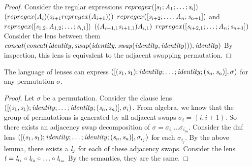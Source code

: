 \begin{lemma}
\begin{proof}
Consider the regular expressions $repregex([\mathit{s}_1;\mathit{A}_1; \ldots;\mathit{s}_i])$ $(repregex(\mathit{A}_i) (\mathit{s}_{i+1} repregex(\mathit{A}_{i+1})))$ $repregex([\mathit{s}_{i+2} ; \ldots ; \mathit{A}_{n} ; \mathit{s}_{n+1}])$ and 
$repregex([\mathit{s}_{1,2};\mathit{A}_{1,2}; \ldots;\mathit{s}_{i,1}])$ $((\mathit{A}_{i+1,1} \mathit{s}_{i+1,1})\mathit{A}_{i,1})$ $repregex([\mathit{s}_{i+2,1} ; \ldots ; \mathit{A}_{n} ; \mathit{s}_{n+1}])$
Consider the lens between them\\ $\mathit{concat}(\mathit{concat}(\mathit{identity},\mathit{swap}(\mathit{identity},\mathit{swap}(\mathit{identity},\mathit{identity}))),\mathit{identity})$
By inspection, this lens is equivalent to the adjacent swapping permutation.
\end{proof}
\end{lemma}

\begin{lemma}
\label{lem:perm-exp}
The language of lenses can express $([(\mathit{s}_1,\mathit{s}_1) ; \mathit{identity} ; \ldots ; \mathit{identity} ; (\mathit{s}_n,\mathit{s}_n)], \sigma)$
for any permutation $\sigma$.
\begin{proof}
Let $\sigma$ be a permutation.
Consider the clause lens $([(\mathit{s}_1,\mathit{s}_1) ; \mathit{identity} ; \ldots ; \mathit{identity} ; (\mathit{s}_n,\mathit{s}_n)], \sigma_{i})$.
From algebra, we know that the group of permutations is generated by all
adjacent swaps $\sigma_i = (i,i+1)$.
So there exists an adjacency swap decomposition of $\sigma = \sigma_{i_1}\ldots\sigma_{i_m}$.
Consider the dnf lens $([(\mathit{s}_1,\mathit{s}_1) ; \mathit{identity} ; \ldots ; \mathit{identity} ; (\mathit{s}_n,\mathit{s}_n)], \sigma_{i_j})$ for each $\sigma_{i_j}$.
By the above lemma, there exists a $\mathit{l}_j$ for each of these adjacency swaps.
Consider the lens $\mathit{l} = \mathit{l}_{i_1} \circ \mathit{l}_{i_2} \circ \ldots  \circ \mathit{l}_{i_m}$
By the semantics, they are the same.

\end{proof}
\end{lemma}

